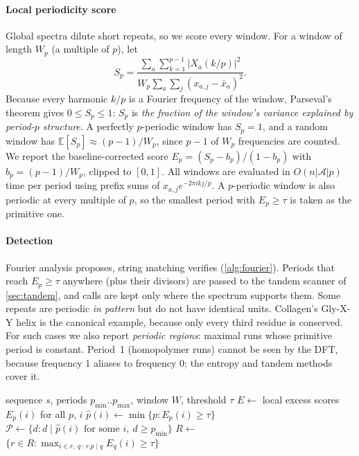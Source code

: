 \documentclass[11pt,a4paper]{article}
\begin{document}
\paragraph{Local periodicity score} Global spectra dilute short repeats, so we score every window.
For a window of length $W_p$ (a multiple of $p$), let
\begin{equation}
  S_p = \frac{\sum_{a}\sum_{k=1}^{p-1} |X_a(k/p)|^2}{W_p \sum_{a}\sum_{j}(x_{a,j}-\bar x_a)^2}.
  \label{eq:sp}
\end{equation}
Because every harmonic $k/p$ is a Fourier frequency of the window, Parseval's theorem gives $0\le S_p\le 1$:
$S_p$ is \emph{the fraction of the window's variance explained by period-$p$ structure}. A perfectly
$p$-periodic window has $S_p = 1$, and a random window has $\mathbb{E}[S_p]\approx (p-1)/W_p$, since
$p-1$ of $W_p$ frequencies are counted. We report the baseline-corrected score
$E_p = (S_p - b_p)/(1-b_p)$ with $b_p = (p-1)/W_p$, clipped to $[0,1]$. All windows are evaluated in
$O(n|\mathcal{A}|p)$ time per period using prefix sums of $x_{a,j}e^{-2\pi i kj/p}$.
A $p$-periodic window is also periodic at every multiple of $p$, so the smallest period with
$E_p \ge \tau$ is taken as the primitive one.

\paragraph{Detection} Fourier analysis proposes, string matching verifies (\cref{alg:fourier}). Periods that
reach $E_p\ge\tau$ anywhere (plus their divisors) are passed to the tandem scanner of \cref{sec:tandem}, and
calls are kept only where the spectrum supports them. Some repeats are periodic \emph{in pattern} but do not
have identical units. Collagen's Gly-X-Y helix is the canonical example, because only every third residue is
conserved. For such cases we also report \emph{periodic regions}: maximal runs whose primitive period is
constant. Period~1 (homopolymer runs) cannot be seen by the DFT, because frequency 1 aliases to frequency 0;
the entropy and tandem methods cover it.

\begin{algorithm}[tbp]
\caption{Spectrum-guided tandem repeat detection}\label{alg:fourier}
\begin{algorithmic}[1]
\Require sequence $s$, periods $p_{\min}..p_{\max}$, window $W$, threshold $\tau$
\State $E \gets$ local excess scores $E_p(i)$ for all $p$, $i$ 
\State $\hat p(i) \gets \min\{p : E_p(i) \ge \tau\}$ 
\State $\mathcal{P} \gets \{d : d \mid \hat p(i)\text{ for some } i,\ d\ge p_{\min}\}$
\State $R \gets$  
\State \Return $\{r\in R : \max_{i\in r,\ q \,:\, r.p \mid q} E_q(i) \ge \tau\}$ 
\end{algorithmic}
\end{algorithm}
\end{document}
